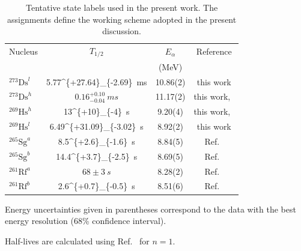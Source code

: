 \documentclass[final,5p,times,twocolumn,number,sort&compress]{elsarticle}
\newcommand{\myerr}[4]{\SI[parse-numbers=false]{#1^{+#2}_{-#3}}{#4}}
\begin{document}
\begin{table}[htbp]
\centering
\caption{Tentative state labels used in the present work. The assignments define the working scheme adopted in the present discussion. }
\label{tab:state_summary}
\begin{threeparttable}
\small
\setlength{\tabcolsep}{4pt}
\begin{tabular*}{\columnwidth}{@{\extracolsep{\fill}}lccc@{}}
\toprule
Nucleus & $T_{1/2}$ & $E_{\alpha}$\tnote{a} & Reference\\
        &           & (\si{MeV})               &          \\
\midrule
$^{273}\mathrm{Ds}^{l}$ & \myerr{5.77}{27.64}{2.69}{ms}\tnote{b} & 10.86(2) & this work \\
$^{273}\mathrm{Ds}^{h}$ & $0.16^{+0.10}_{-0.04}~\si{ms}$ & 11.17(2) & this work,~\cite{hofmann2002NewResultsElements,hofmann1996NewElement112,sumita2013NewResultProduction,morita2007ExperimentSynthesisIsotope277,oganessian2024SynthesisDecayProperties}\\
$^{269}\mathrm{Hs}^{h}$ & \myerr{13}{10}{4}{s} & 9.20(4) & this work,~\cite{hofmann2002NewResultsElements,hofmann1996NewElement112,sumita2013NewResultProduction,morita2007ExperimentSynthesisIsotope277,oganessian2024SynthesisDecayProperties} \\
$^{269}\mathrm{Hs}^{l}$ & \myerr{6.49}{31.09}{3.02}{s}\tnote{b} & 8.92(2) & this work \\
$^{265}\mathrm{Sg}^{a}$ & \myerr{8.5}{2.6}{1.6}{s} & 8.84(5) & Ref.~\cite{habaProduction265Sg2012} \\
$^{265}\mathrm{Sg}^{b}$ & \myerr{14.4}{3.7}{2.5}{s} & 8.69(5) & Ref.~\cite{habaProduction265Sg2012} \\
$^{261}\mathrm{Rf}^{a}$ & $68 \pm 3~\si{s}$ & 8.28(2) & Ref.~\cite{habaProduction265Sg2012} \\
$^{261}\mathrm{Rf}^{b}$ & \myerr{2.6}{0.7}{0.5}{s} & 8.51(6) & Ref.~\cite{habaProduction265Sg2012} \\
\bottomrule
\end{tabular*}
\begin{tablenotes}[flushleft]
\footnotesize
\item[a] Energy uncertainties given in parentheses correspond to the data with the best energy resolution (68\% confidence interval).
\item[b] Half-lives are calculated using Ref.~\cite{schmidtRemarksErrorAnalysis1984a} for $n = 1$.
\end{tablenotes}
\end{threeparttable}
\end{table}
\end{document}
